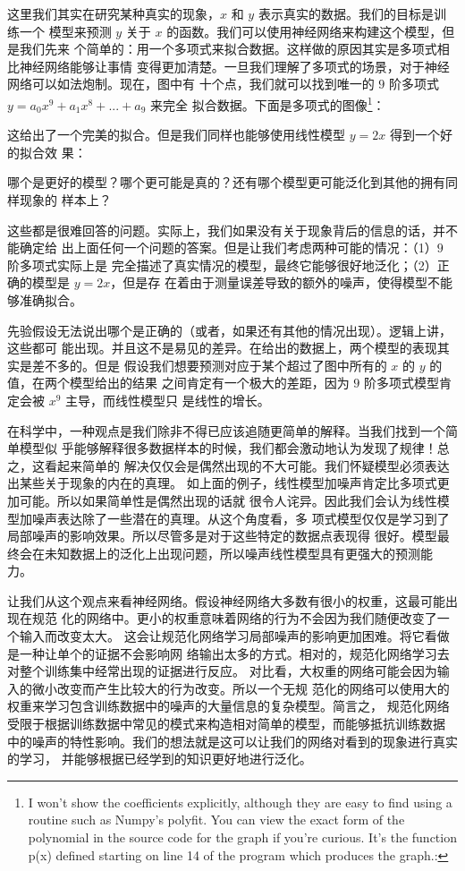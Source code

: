 这里我们其实在研究某种真实的现象，$x$ 和 $y$ 表示真实的数据。我们的目标是训练一个
模型来预测 $y$ 关于 $x$ 的函数。我们可以使用神经网络来构建这个模型，但是我们先来
个简单的：用一个多项式来拟合数据。这样做的原因其实是多项式相比神经网络能够让事情
变得更加清楚。一旦我们理解了多项式的场景，对于神经网络可以如法炮制。现在，图中有
十个点，我们就可以找到唯一的 $9$ 阶多项式 $y=a_0x^9 + a_1x^8 + ... + a_9$ 来完全
拟合数据。下面是多项式的图像\footnote{I won't show the coefficients explicitly,
  although they are easy to find using a routine such as Numpy's polyfit. You
  can view the exact form of the polynomial in the source code for the graph if
  you're curious. It's the function p(x) defined starting on line 14 of the
  program which produces the graph.:

}：

这给出了一个完美的拟合。但是我们同样也能够使用线性模型 $y=2x$ 得到一个好的拟合效
果：

哪个是更好的模型？哪个更可能是真的？还有哪个模型更可能泛化到其他的拥有同样现象的
样本上？

这些都是很难回答的问题。实际上，我们如果没有关于现象背后的信息的话，并不能确定给
出上面任何一个问题的答案。但是让我们考虑两种可能的情况：（1）$9$ 阶多项式实际上是
完全描述了真实情况的模型，最终它能够很好地泛化；（2）正确的模型是 $y=2x$，但是存
在着由于测量误差导致的额外的噪声，使得模型不能够准确拟合。

先验假设无法说出哪个是正确的（或者，如果还有其他的情况出现）。逻辑上讲，这些都可
能出现。并且这不是易见的差异。在给出的数据上，两个模型的表现其实是差不多的。但是
假设我们想要预测对应于某个超过了图中所有的 $x$ 的 $y$ 的值，在两个模型给出的结果
之间肯定有一个极大的差距，因为 $9$ 阶多项式模型肯定会被 $x^9$ 主导，而线性模型只
是线性的增长。

在科学中，一种观点是我们除非不得已应该追随更简单的解释。当我们找到一个简单模型似
乎能够解释很多数据样本的时候，我们都会激动地认为发现了规律！总之，这看起来简单的
解决仅仅会是偶然出现的不大可能。我们怀疑模型必须表达出某些关于现象的内在的真理。
如上面的例子，线性模型加噪声肯定比多项式更加可能。所以如果简单性是偶然出现的话就
很令人诧异。因此我们会认为线性模型加噪声表达除了一些潜在的真理。从这个角度看，多
项式模型仅仅是学习到了局部噪声的影响效果。所以尽管多是对于这些特定的数据点表现得
很好。模型最终会在未知数据上的泛化上出现问题，所以噪声线性模型具有更强大的预测能
力。

让我们从这个观点来看神经网络。假设神经网络大多数有很小的权重，这最可能出现在规范
化的网络中。更小的权重意味着网络的行为不会因为我们随便改变了一个输入而改变太大。
这会让规范化网络学习局部噪声的影响更加困难。将它看做是一种让单个的证据不会影响网
络输出太多的方式。相对的，规范化网络学习去对整个训练集中经常出现的证据进行反应。
对比看，大权重的网络可能会因为输入的微小改变而产生比较大的行为改变。所以一个无规
范化的网络可以使用大的权重来学习包含训练数据中的噪声的大量信息的复杂模型。简言之，
规范化网络受限于根据训练数据中常见的模式来构造相对简单的模型，而能够抵抗训练数据
中的噪声的特性影响。我们的想法就是这可以让我们的网络对看到的现象进行真实的学习，
并能够根据已经学到的知识更好地进行泛化。

